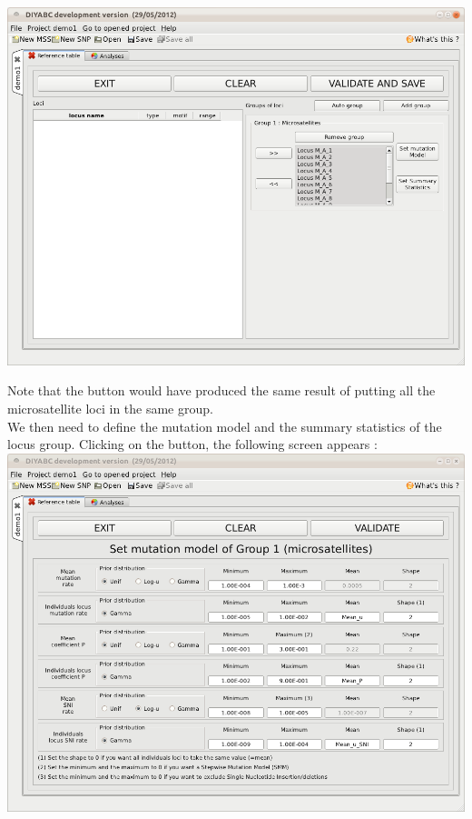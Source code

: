 \includegraphics[scale=0.35]{gui_pictures/Capture-DIYABC-18.png}

Note that the  button would have produced the same result of putting all the microsatellite loci in the same group.\\  

We then need to define the mutation model and the summary statistics of the locus group. Clicking on the  button, the following screen appears :\\

\includegraphics[scale=0.35]{gui_pictures/Capture-DIYABC-19.png} 

